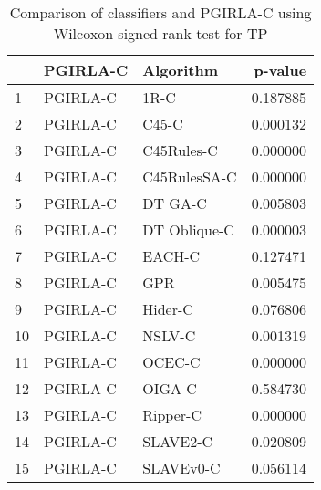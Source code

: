 \begin{table}
\footnotesize
\caption{Comparison of classifiers and PGIRLA-C using Wilcoxon signed-rank test for TP}
\label{tab:PGIRLA-C wilcoxon TP comparison}
\begin{tabular}{lllr}
\hline
 & PGIRLA-C & Algorithm & p-value \\
\hline
1 & PGIRLA-C & 1R-C & 0.187885 \\
2 & PGIRLA-C & C45-C & 0.000132 \\
3 & PGIRLA-C & C45Rules-C & 0.000000 \\
4 & PGIRLA-C & C45RulesSA-C & 0.000000 \\
5 & PGIRLA-C & DT GA-C & 0.005803 \\
6 & PGIRLA-C & DT Oblique-C & 0.000003 \\
7 & PGIRLA-C & EACH-C & 0.127471 \\
8 & PGIRLA-C & GPR & 0.005475 \\
9 & PGIRLA-C & Hider-C & 0.076806 \\
10 & PGIRLA-C & NSLV-C & 0.001319 \\
11 & PGIRLA-C & OCEC-C & 0.000000 \\
12 & PGIRLA-C & OIGA-C & 0.584730 \\
13 & PGIRLA-C & Ripper-C & 0.000000 \\
14 & PGIRLA-C & SLAVE2-C & 0.020809 \\
15 & PGIRLA-C & SLAVEv0-C & 0.056114 \\
\hline
\end{tabular}
\end{table}
